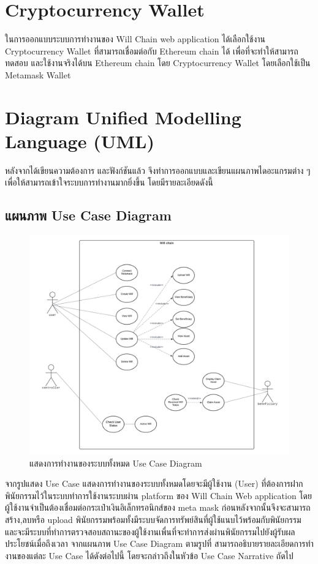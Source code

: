 \documentclass[12pt,oneside,openright,a4paper]{cpe-thai-project}
\begin{document}
\section{Cryptocurrency Wallet}
\tab ในการออกแบบระบบการทํางานของ Will Chain web application ได้เลือกใช้งาน Cryptocurrency Wallet ที่สามารถเชื่อมต่อกับ
Ethereum chain ได้ เพื่อที่จะทําให้สามารถทดสอบ และใช้งานจริงได้บน Ethereum chain โดย Cryptocurrency Wallet โดยเลือกใช้เป็น Metamask Wallet

\section{Diagram Unified Modelling Language (UML)}
\tab หลังจากได้เขียนความต้องการ และฟังก์ชันแล้ว จึงทำการออกแบบและเขียนแผนภาพไดอะแกรมต่าง ๆ เพื่อให้สามารถเข้าใจระบบการทำงานมากยิ่งขึ้น โดยมีรายละเอียดดังนี้

\subsection{แผนภาพ Use Case Diagram}
	\begin{figure}[!htb]
		\centering
		\includegraphics[scale=0.5]{UseCaseDiagram}
		\caption{แสดงการทำงานของระบบทั้งหมด Use Case Diagram}
	\end{figure}
\FloatBarrier
\tab จากรูปแสดง Use Case แสดงการทำงานของระบบทั้งหมดโดยจะมีผู้ใช้งาน (User) ที่ต้องการฝากพินัยกรรมไว้ในระบบทำการใช้งานระบบผ่าน platform ของ Will Chain Web application  โดยผู้ใช้งานจำเป็นต้องเชื่อมต่อกระเป๋าเงินอิเล็กทรอนิกส์ของ meta mask ก่อนหลังจากนั้นจึงจะสามารถ สร้าง,ลบหรือ upload พินัยกรรมพร้อมทั้งมีระบบจัดการทรัพย์สินที่ผู้ใช้แนบไว้พร้อมกับพินัยกรรม และจะมีระบบที่ทำการตรวจสอบสถานะของผู้ใช้งานเพื่นที่จะทำการส่งผ่านพินัยกรรมไปยังผู้รับผลประโยชน์เมื่อถึงเวลา   จากแผนภาพ Use Case Diagram ตามรูปที่ สามารถอธิบายรายละเอียดการทํา งานของแต่ละ Use Case ได้ดังต่อไปนี้ โดยจะกล่าวถึงในหัวข้อ Use Case Narrative ถัดไป
\clearpage
\end{document}
